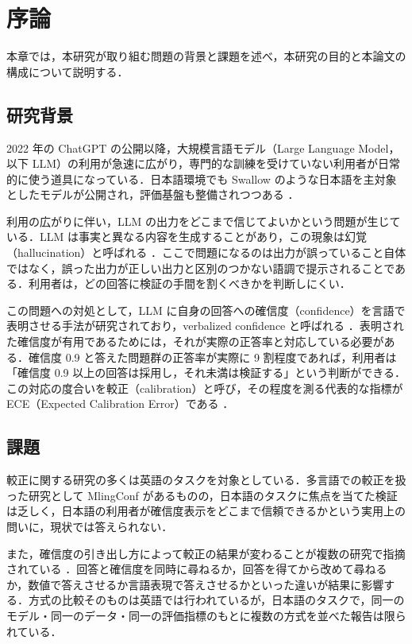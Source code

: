 \chapter{序論}

本章では，本研究が取り組む問題の背景と課題を述べ，本研究の目的と本論文の構成について説明する．

\section{研究背景}

2022 年の ChatGPT の公開以降，大規模言語モデル（Large Language Model，以下 LLM）の利用が急速に広がり，専門的な訓練を受けていない利用者が日常的に使う道具になっている．日本語環境でも Swallow \cite{fujii2024swallow} のような日本語を主対象としたモデルが公開され，評価基盤も整備されつつある \cite{llmjpeval2024}．

利用の広がりに伴い，LLM の出力をどこまで信じてよいかという問題が生じている．LLM は事実と異なる内容を生成することがあり，この現象は幻覚（hallucination）と呼ばれる \cite{ji2023hallucination}．ここで問題になるのは出力が誤っていること自体ではなく，誤った出力が正しい出力と区別のつかない語調で提示されることである．利用者は，どの回答に検証の手間を割くべきかを判断しにくい．

この問題への対処として，LLM に自身の回答への確信度（confidence）を言語で表明させる手法が研究されており，verbalized confidence と呼ばれる \cite{kadavath2022know}\cite{lin2022teaching}\cite{tian2023justask}．表明された確信度が有用であるためには，それが実際の正答率と対応している必要がある．確信度 0.9 と答えた問題群の正答率が実際に 9 割程度であれば，利用者は「確信度 0.9 以上の回答は採用し，それ未満は検証する」という判断ができる．この対応の度合いを較正（calibration）と呼び，その程度を測る代表的な指標が ECE（Expected Calibration Error）である \cite{guo2017calibration}．

\section{課題}

較正に関する研究の多くは英語のタスクを対象としている．多言語での較正を扱った研究として MlingConf \cite{xue2025mlingconf} があるものの，日本語のタスクに焦点を当てた検証は乏しく，日本語の利用者が確信度表示をどこまで信頼できるかという実用上の問いに，現状では答えられない．

また，確信度の引き出し方によって較正の結果が変わることが複数の研究で指摘されている \cite{tian2023justask}\cite{xiong2024llmuncertainty}．回答と確信度を同時に尋ねるか，回答を得てから改めて尋ねるか，数値で答えさせるか言語表現で答えさせるかといった違いが結果に影響する．方式の比較そのものは英語では行われているが，日本語のタスクで，同一のモデル・同一のデータ・同一の評価指標のもとに複数の方式を並べた報告は限られている．

